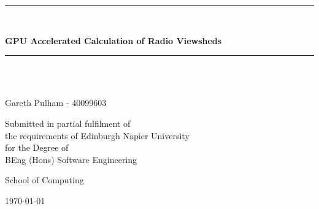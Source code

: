 \documentclass[12pt,a4paper]{article}
\begin{document}
    \newcommand{\HRule}{\rule{\linewidth}{0.5mm}}
    \begin{titlepage}
        \begin{center}

        \HRule \\[0.4cm]
        {\Large \bfseries GPU Accelerated Calculation of Radio Viewsheds\par}
        \vspace{0.2cm}
        \HRule \\[1.5cm]

        \vspace{3cm}
        \begin{minipage}{0.4\textwidth}
        \begin{center} \large
        \emph{}\\
                Gareth Pulham - 40099603
        \end{center}
        \end{minipage}

        \vspace{2cm}
        \begin{minipage}{1\textwidth}
        \begin{center} \large
                Submitted in partial fulfilment of \\
                the requirements of Edinburgh Napier University \\
                for the Degree of \\
                BEng (Hons) Software Engineering
        \end{center}
        \end{minipage}

        \vfill

        \begin{minipage}{1\textwidth}
        \begin{center} \large
                School of Computing
        \end{center}
        \end{minipage}

        \vspace{1cm}
        {\large \today}


        \end{center}
    \end{titlepage}
\end{document}
